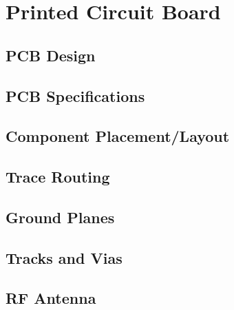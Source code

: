 \newpage

\section{Printed Circuit Board}\label{03Sec:PCB}



    


\subsection{PCB Design}\label{03Sub:PCBDesign}


\subsection{PCB Specifications}\label{03Sub:PCBSpecifications}



\subsection{Component Placement/Layout}\label{03Sub:ComponentPlacementLayout}



\subsection{Trace Routing}\label{03Sub:TraceRouting}



\subsection{Ground Planes}\label{03Sub:Ground planes}



\subsection{Tracks and Vias}\label{03Sub:HolesAndVias}



\subsection{RF Antenna}\label{03Sub:RFAntenna}




